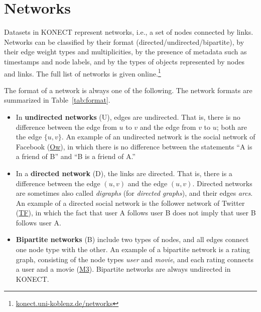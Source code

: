 \documentclass{article}
\begin{document}
\section{Networks}
\label{sec:taxonomy}
Datasets in KONECT represent networks, i.e., a set of nodes connected by
links. Networks can be classified by their format
(directed/undirected/bipartite), by their edge weight types and
multiplicities, by the 
presence of metadata such as timestamps and node labels, and by
the types of objects represented by nodes and links. 
The full list of networks is given
online.\footnote{\href{http://konect.uni-koblenz.de/networks/}{konect.uni-koblenz.de/networks}}  

The format of a network is always one of the following.  The network
formats are summarized in Table~\ref{tab:format}. 
\begin{itemize}
\item 
  In \textbf{undirected networks} (U), 
  edges are undirected.  That is,
  there is no difference between the edge from $u$ to $v$ and the edge
  from $v$ to $u$; both are the edge $\{u,v\}$. 
  An example of an undirected network is the social network of
  Facebook
  (\href{http://konect.uni-koblenz.de/networks/facebook-wosn-wall}{\textsf{Ow}}),
  in which there is no difference between the statements ``A 
  is a friend of B'' and ``B is a friend of A.''
\item In a \textbf{directed network} (D), 
  the links are directed. That is, there is a
  difference between the edge $(u,v)$ and the edge $(u,v)$. 
  Directed networks are sometimes also called \emph{digraphs} (for \emph{directed
    graphs}), and their edges \emph{arcs}. 
  An example of a directed social network is the follower network of
  Twitter
  (\href{http://konect.uni-koblenz.de/networks/twitter_mpi}{\textsf{TF}}),
  in which the fact that user A follows user B does not imply 
  that user B follows user A. 
\item \textbf{Bipartite networks} (B) 
  include two types of nodes, and all edges
  connect one node type with the other. An example of a bipartite
  network is a rating graph, consisting of the node types \emph{user}
  and \emph{movie}, and each rating connects a user and a movie
  (\href{http://konect.uni-koblenz.de/networks/movielens-10m_rating}{\textsf{M3}}).  
  Bipartite networks are always undirected in KONECT. 
\end{itemize}
\end{document}
